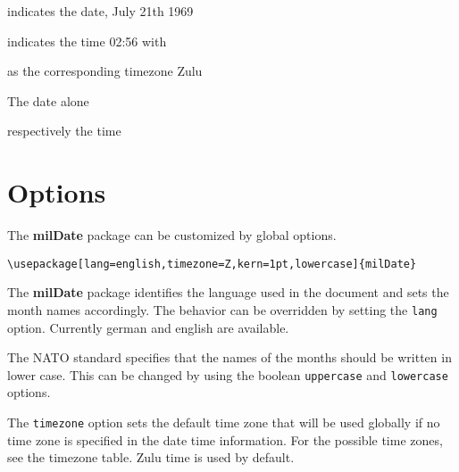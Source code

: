 \documentclass[a4paper,10pt]{scrarticle}
\begin{document}
 indicates the date, July 21th 1969\par\medskip

 indicates the time 02:56 with \par\medskip
{} as the corresponding timezone Zulu\par\medskip

The date alone

\par\begin{center}
\end{center}\par

respectively the time

\par\begin{center}
\end{center}\par

\section{Options}

The \textbf{milDate} package can be customized by global options.

\verb+\usepackage[lang=english,timezone=Z,kern=1pt,lowercase]{milDate}+

\noindent{} The \textbf{milDate} package identifies the language used in the document and sets the month names accordingly. The behavior can be overridden by setting the \verb+lang+ option.
Currently german and english are available.

\noindent{} The NATO standard specifies that the names of the months should be written in lower case. This can be changed by using the boolean \verb+uppercase+ and \verb+lowercase+ options.

\noindent{} The \verb+timezone+ option sets the default time zone that will be used globally if no time zone is specified in the date time information. For the possible time zones, see the timezone table. Zulu time is used by default.
\end{document}
